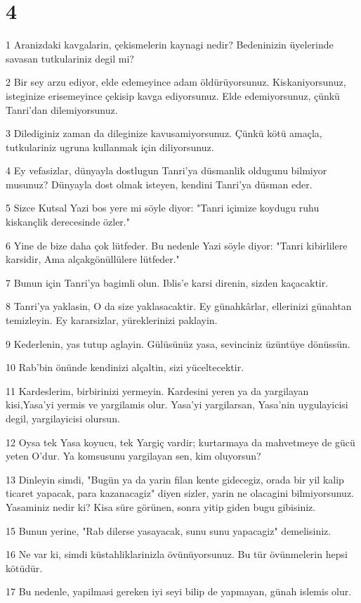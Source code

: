 \chapter{4}

\par 1 Aranizdaki kavgalarin, çekismelerin kaynagi nedir? Bedeninizin üyelerinde savasan tutkulariniz degil mi?
\par 2 Bir sey arzu ediyor, elde edemeyince adam öldürüyorsunuz. Kiskaniyorsunuz, isteginize erisemeyince çekisip kavga ediyorsunuz. Elde edemiyorsunuz, çünkü Tanri'dan dilemiyorsunuz.
\par 3 Dilediginiz zaman da dileginize kavusamiyorsunuz. Çünkü kötü amaçla, tutkulariniz ugruna kullanmak için diliyorsunuz.
\par 4 Ey vefasizlar, dünyayla dostlugun Tanri'ya düsmanlik oldugunu bilmiyor musunuz? Dünyayla dost olmak isteyen, kendini Tanri'ya düsman eder.
\par 5 Sizce Kutsal Yazi bos yere mi söyle diyor: "Tanri içimize koydugu ruhu kiskançlik derecesinde özler."
\par 6 Yine de bize daha çok lütfeder. Bu nedenle Yazi söyle diyor: "Tanri kibirlilere karsidir, Ama alçakgönüllülere lütfeder."
\par 7 Bunun için Tanri'ya bagimli olun. Iblis'e karsi direnin, sizden kaçacaktir.
\par 8 Tanri'ya yaklasin, O da size yaklasacaktir. Ey günahkârlar, ellerinizi günahtan temizleyin. Ey kararsizlar, yüreklerinizi paklayin.
\par 9 Kederlenin, yas tutup aglayin. Gülüsünüz yasa, sevinciniz üzüntüye dönüssün.
\par 10 Rab'bin önünde kendinizi alçaltin, sizi yüceltecektir.
\par 11 Kardeslerim, birbirinizi yermeyin. Kardesini yeren ya da yargilayan kisi,Yasa'yi yermis ve yargilamis olur. Yasa'yi yargilarsan, Yasa'nin uygulayicisi degil, yargilayicisi olursun.
\par 12 Oysa tek Yasa koyucu, tek Yargiç vardir; kurtarmaya da mahvetmeye de gücü yeten O'dur. Ya komsusunu yargilayan sen, kim oluyorsun?
\par 13 Dinleyin simdi, "Bugün ya da yarin filan kente gidecegiz, orada bir yil kalip ticaret yapacak, para kazanacagiz" diyen sizler, yarin ne olacagini bilmiyorsunuz. Yasaminiz nedir ki? Kisa süre görünen, sonra yitip giden bugu gibisiniz.
\par 15 Bunun yerine, "Rab dilerse yasayacak, sunu sunu yapacagiz" demelisiniz.
\par 16 Ne var ki, simdi küstahliklarinizla övünüyorsunuz. Bu tür övünmelerin hepsi kötüdür.
\par 17 Bu nedenle, yapilmasi gereken iyi seyi bilip de yapmayan, günah islemis olur.

